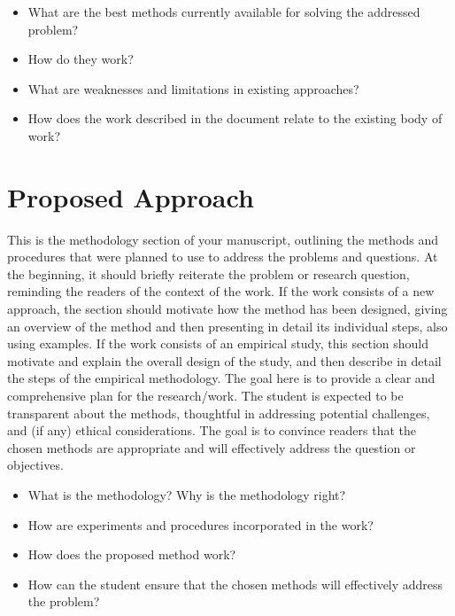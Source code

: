 \begin{itemize}
    \item What are the best methods currently available for solving the addressed problem?
    \item How do they work?
    \item What are weaknesses and limitations in existing approaches?
    \item How does the work described in the document relate to the existing body of work?
\end{itemize}

\chapter{Proposed Approach}
This is the methodology section of your manuscript, outlining the methods and procedures that were planned to use to address the problems and questions. At the beginning, it should briefly reiterate the problem or research question, reminding the readers of the context of the work. 
If the work consists of a new approach, the section should motivate how the method has been designed, giving an overview of the method and then presenting in detail its individual steps, also using examples. 
If the work consists of an empirical study, this section should motivate and explain the overall design of the study, and then describe in detail the steps of the empirical methodology. The goal here is to provide a clear and comprehensive plan for the research/work. The student is expected to be transparent about the methods, thoughtful in addressing potential challenges, and (if any) ethical considerations. The goal is to convince readers that the chosen methods are appropriate and will effectively address the question or objectives.

\begin{itemize}
    \item What is the methodology? Why is the methodology right?
    \item How are experiments and procedures incorporated in the work?
    \item How does the proposed method work?
    \item How can the student ensure that the chosen methods will effectively address the problem?
\end{itemize}

